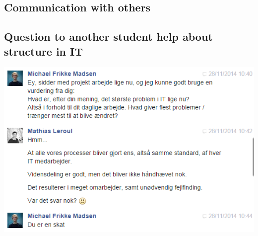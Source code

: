 \begin{linenumbers*}
\section{Communication with others}

\subsection{Question to another student help about structure in IT}
\includegraphics[width=1.36\textwidth]{appendix/other_communication_1}
\end{linenumbers*}